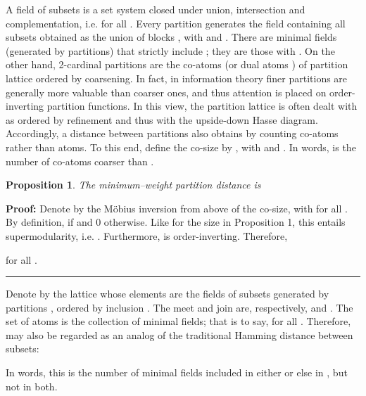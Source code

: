 \documentclass[a4paper,10pt]{article}
\newtheorem{proposition}[theorem]{Proposition}
\newenvironment{proof}[1][Proof]{\noindent\textbf{#1: }}{\ \rule{0.5em}{0.5em}}
\begin{document}
A field of subsets is a set system  closed under union, intersection and complementation, i.e.  for all
. Every partition  generates the field  containing all subsets  obtained as the union of blocks , with
 and . There are  minimal fields (generated by partitions) that strictly include
; they are those  with .
On the other hand,
2-cardinal partitions  are the co-atoms \cite{Aigner79} (or dual atoms \cite{RotaMobius}) of partition lattice  ordered
by coarsening. In fact, in information theory finer partitions are generally more valuable than coarser ones, and thus attention is placed on order-inverting partition functions.
In this view, the partition lattice is often dealt with as ordered by refinement and thus with the upside-down Hasse diagram. Accordingly,
a distance between partitions also obtains by counting co-atoms rather than atoms. To this end, define the co-size
 by , with  and . In words,  is
the number of co-atoms coarser than . 

\begin{proposition}
The minimum--weight partition distance is

\end{proposition}

\begin{proof}
Denote by  the M\"obius inversion from above \cite{Aigner79,RotaMobius} of the co-size, with
 for all . By definition,  if  and 0 otherwise. Like for the size in Proposition 1, this entails
supermodularity, i.e. . Furthermore,  is order-inverting. Therefore,

for all .
\end{proof}

Denote by  the lattice whose elements are the  fields of subsets  generated by partitions , ordered by
inclusion . The meet and join are, respectively,  and .
The set of atoms is the collection  of minimal fields; that is to say,
 for all . Therefore,  may also be regarded as an analog of
the traditional Hamming distance between subsets:

In words, this is the number of minimal fields  included in either  or else in , but not in both.
\end{document}
